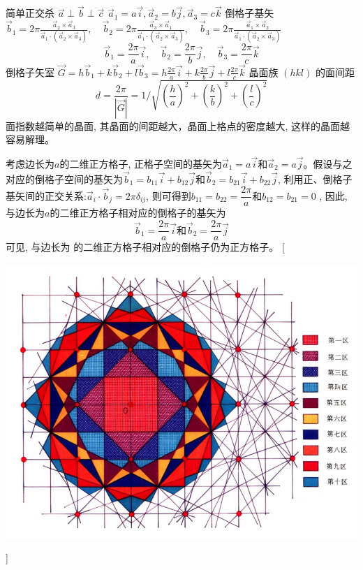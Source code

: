 \documentclass[UTF8,12pt, a4paper, oneside]{ctexart}
\begin{document}
        {简单正交杀 $\vec{a} \perp \vec{b} \perp \vec{c}$ $ \vec{a}_{1}=a\vec{i}, \vec{a}_{2}=b \vec{j}, \vec{a}_3=c\vec{k}$
        倒格子基矢 $\vec{b}_{1}=2 \pi \frac{\vec{a}_{2} \times \vec{a}_{3}}{\vec{a}_{1} \cdot (\vec{a}_{2} \times \vec{a}_{3})}, \quad \vec{b}_{2}=2 \pi \frac{\vec{a}_{3} \times \vec{a}_{1}}{\vec{a}_{1} \cdot(\vec{a}_{2} \times \vec{a}_{3})}, \quad \vec{b}_{3}=2 \pi \frac{\vec{a}_{1} \times \vec{a}_{2}}{\vec{a}_{1} \cdot (\vec{a}_{2} \times \vec{a}_{3})}$
        $$
        \vec{b}_{1}=\frac{2 \pi}{a} \vec{i}, \quad \vec{b}_{2}=\frac{2 \pi}{b} \vec{j}, \quad \vec{b}_{3}=\frac{2 \pi}{c} \vec{k}
        $$
        倒格子矢室 $\vec{G}=h \vec{b}_{1}+k \vec{b}_{2}+l \vec{b}_{3}=h \frac{2 \pi}{a} \vec{i}+k \frac{2 \pi}{b} \vec{j}+l \frac{2 \pi}{c} \vec{k}$ 晶面族  $(hkl)$ 的面间距
        $$
        d=\frac{2 \pi}{|\vec{G}|}=1 / \sqrt{(\frac{h}{a})^{2}+(\frac{k}{b})^{2}+(\frac{l}{c})^{2}}
        $$ 面指数越简单的晶面, 其晶面的间距越大，晶面上格点的密度越大, 这样的晶面越容易解理。}

    {考虑边长为$a$的二维正方格子, 正格子空间的基矢为$\vec{a}_1=a\vec{i}$和$\vec{a}_2=a\vec{j}$。假设与之对应的倒格子空间的基矢为$\vec{b}_1=b_{11}\vec{i}+b_{12}\vec{j}$和$\vec{b}_2=b_{21}\vec{i}+b_{22}\vec{j}$, 利用正、倒格子基矢间的正交关系:$\vec{a}_i \cdot \vec{b}_j =2 \pi \delta_{ij}$, 则可得到$b_{11}=b_{22}=\dfrac{2 \pi}{a}$和$b_{12}=b_{21}=0$ , 因此, 与边长为$a$的二维正方格子相对应的倒格子的基矢为\[\vec{b}_1=\dfrac{2 \pi}{a}\vec{i} \text{和} \vec{b}_2=\dfrac{2 \pi}{a}\vec{j}\]
     可见, 与边长为  的二维正方格子相对应的倒格子仍为正方格子。}
     [\begin{center}
        \includegraphics{picture/3-10 .png}
    \end{center}]
\end{document}
